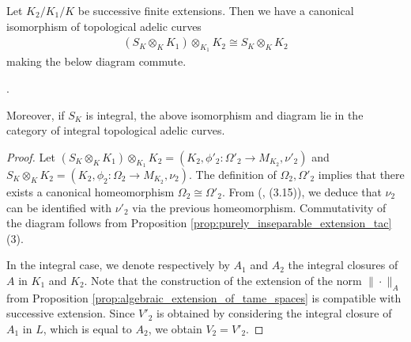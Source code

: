 \documentclass [11pt,reqno]{amsart}
\newcommand{\1}{\mathmybb{1}}
\begin{document}
\begin{proposition}
\label{prop:successive_finite_extensions_tac}
Let $K_2/K_1/K$ be successive finite extensions. Then we have a canonical isomorphism of topological adelic curves
\begin{align*}
\left(S_K \otimes_{K} K_1 \right) \otimes_{K_1} K_2 \cong S_K \otimes_{K} K_2
\end{align*}
making the below diagram commute.
\begin{center}
.
\end{center}
Moreover, if $S_K$ is integral, the above isomorphism and diagram lie in the category of integral topological adelic curves.
\end{proposition}

\begin{proof}
Let $\left(S_K \otimes_{K} K_1 \right) \otimes_{K_1} K_2 = (K_2,\phi'_2 :\Omega'_2 \to M_{K_{2}},\nu'_2)$ and $S_K \otimes_{K} K_2 = (K_2,\phi_2 : \Omega_2 \to M_{K_{2}},\nu_2)$. The definition of $\Omega_{2},\Omega'_{2}$ implies that there exists a canonical homeomorphism $\Omega_{2} \cong \Omega'_{2}$. From (\cite{ChenMori}, (3.15)), we deduce that $\nu_2$ can be identified with $\nu'_2$ via the previous homeomorphism. Commutativity of the diagram follows from Proposition \ref{prop:purely_inseparable_extension_tac} (3).

In the integral case, we denote respectively by $A_1$ and $A_2$ the integral closures of $A$ in $K_1$ and $K_2$. Note that the construction of the extension of the norm $\|\cdot\|_A$ from Proposition \ref{prop:algebraic_extension_of_tame_spaces} is compatible with successive extension. Since $V'_2$ is obtained by considering the integral closure of $A_1$ in $L$, which is equal to $A_2$, we obtain $V_2 = V'_2$. 
\end{proof}
\end{document}
